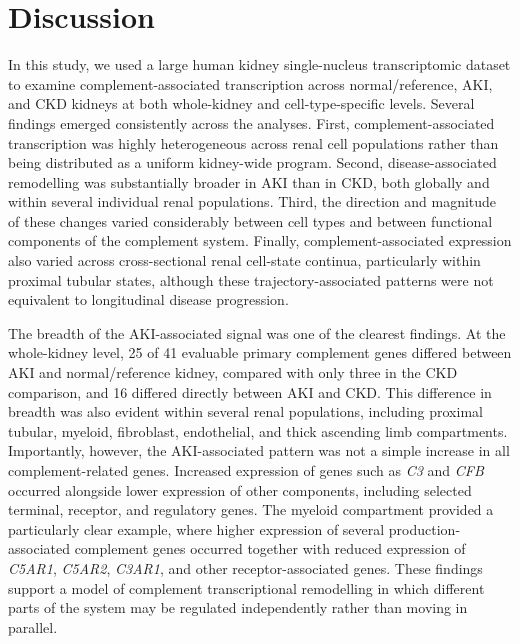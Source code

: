 \documentclass[10pt,letterpaper]{article}
\begin{document}
\section*{Discussion}

In this study, we used a large human kidney single-nucleus transcriptomic dataset to examine complement-associated transcription across normal/reference, AKI, and CKD kidneys at both whole-kidney and cell-type-specific levels. Several findings emerged consistently across the analyses. First, complement-associated transcription was highly heterogeneous across renal cell populations rather than being distributed as a uniform kidney-wide program. Second, disease-associated remodelling was substantially broader in AKI than in CKD, both globally and within several individual renal populations. Third, the direction and magnitude of these changes varied considerably between cell types and between functional components of the complement system. Finally, complement-associated expression also varied across cross-sectional renal cell-state continua, particularly within proximal tubular states, although these trajectory-associated patterns were not equivalent to longitudinal disease progression.

The breadth of the AKI-associated signal was one of the clearest findings. At the whole-kidney level, 25 of 41 evaluable primary complement genes differed between AKI and normal/reference kidney, compared with only three in the CKD comparison, and 16 differed directly between AKI and CKD. This difference in breadth was also evident within several renal populations, including proximal tubular, myeloid, fibroblast, endothelial, and thick ascending limb compartments. Importantly, however, the AKI-associated pattern was not a simple increase in all complement-related genes. Increased expression of genes such as \textit{C3} and \textit{CFB} occurred alongside lower expression of other components, including selected terminal, receptor, and regulatory genes. The myeloid compartment provided a particularly clear example, where higher expression of several production-associated complement genes occurred together with reduced expression of \textit{C5AR1}, \textit{C5AR2}, \textit{C3AR1}, and other receptor-associated genes. These findings support a model of complement transcriptional remodelling in which different parts of the system may be regulated independently rather than moving in parallel.
\end{document}

